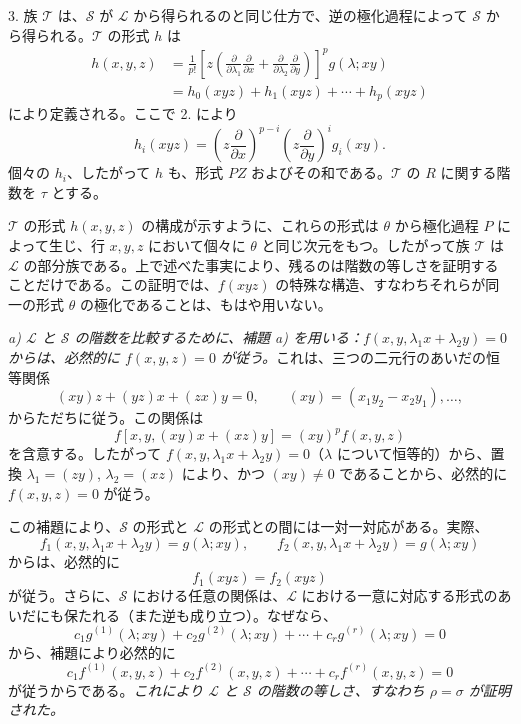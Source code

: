 3. 族 $\mathcal T$ は、$\mathcal S$ が $\mathcal L$ から得られるのと同じ仕方で、逆の極化過程によって $\mathcal S$ から得られる。$\mathcal T$ の形式 $h$ は
\[
\begin{aligned}
 h(x,y,z)
 &=\frac1{p!}\left[z\left(\frac{\partial}{\partial\lambda_1}\frac{\partial}{\partial x}
 +\frac{\partial}{\partial\lambda_2}\frac{\partial}{\partial y}\right)\right]^p g(\lambda;xy)\\
 &=h_0(xyz)+h_1(xyz)+\cdots+h_p(xyz)
\end{aligned}
\]
により定義される。ここで 2. により
\[
  h_i(xyz)=
  \left(z\frac{\partial}{\partial x}\right)^{p-i}
  \left(z\frac{\partial}{\partial y}\right)^i g_i(xy).
\]
個々の $h_i$、したがって $h$ も、形式 $PZ$ およびその和である。$\mathcal T$ の $R$ に関する階数を $\tau$ とする。

$\mathcal T$ の形式 $h(x,y,z)$ の構成が示すように、これらの形式は $\theta$ から極化過程 $P$ によって生じ、行 $x,y,z$ において個々に $\theta$ と同じ次元をもつ。したがって族 $\mathcal T$ は $\mathcal L$ の部分族である。上で述べた事実により、残るのは階数の等しさを証明することだけである。この証明では、$f(xyz)$ の特殊な構造、すなわちそれらが同一の形式 $\theta$ の極化であることは、もはや用いない。

\emph{a) $\mathcal L$ と $\mathcal S$ の階数を比較するために、補題 a) を用いる：$f(x,y,\lambda_1x+\lambda_2y)=0$ からは、必然的に $f(x,y,z)=0$ が従う。}これは、三つの二元行のあいだの恒等関係
\[
  (xy)z+(yz)x+(zx)y=0,
  \qquad (xy)=(x_1y_2-x_2y_1),\ldots,
\]
からただちに従う。この関係は
\[
  f[x,y,(xy)x+(xz)y]=(xy)^p f(x,y,z)
\]
を含意する。したがって $f(x,y,\lambda_1x+\lambda_2y)=0$（$\lambda$ について恒等的）から、置換 $\lambda_1=(zy)$, $\lambda_2=(xz)$ により、かつ $(xy)\ne0$ であることから、必然的に $f(x,y,z)=0$ が従う。

この補題により、$\mathcal S$ の形式と $\mathcal L$ の形式との間には一対一対応がある。実際、
\[
  f_1(x,y,\lambda_1x+\lambda_2y)=g(\lambda;xy),\qquad
  f_2(x,y,\lambda_1x+\lambda_2y)=g(\lambda;xy)
\]
からは、必然的に
\[
  f_1(xyz)=f_2(xyz)
\]
が従う。さらに、$\mathcal S$ における任意の関係は、$\mathcal L$ における一意に対応する形式のあいだにも保たれる（また逆も成り立つ）。なぜなら、
\[
  c_1g^{(1)}(\lambda;xy)+c_2g^{(2)}(\lambda;xy)+\cdots+c_rg^{(r)}(\lambda;xy)=0
\]
から、補題により必然的に
\[
  c_1f^{(1)}(x,y,z)+c_2f^{(2)}(x,y,z)+\cdots+c_rf^{(r)}(x,y,z)=0
\]
が従うからである。\emph{これにより $\mathcal L$ と $\mathcal S$ の階数の等しさ、すなわち $\rho=\sigma$ が証明された。}

